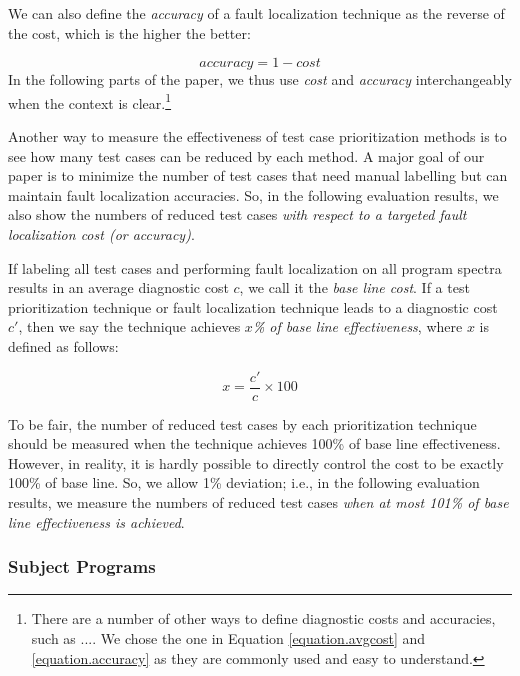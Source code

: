 We can also define the {\em accuracy} of a fault localization technique as the reverse of the cost, which is the higher the better:

\begin{equation}\label{equation.accuracy}
	accuracy = 1 - cost
\end{equation}
In the following parts of the paper, we thus use {\em cost} and {\em accuracy} interchangeably when the context is clear.\footnote{There are a number of other ways to define diagnostic costs and accuracies, such as .... We chose the one in Equation \ref{equation.avgcost} and \ref{equation.accuracy} as they are commonly used and easy to understand.}

Another way to measure the effectiveness of test case prioritization methods is to see how many test cases can be reduced by each method.
A major goal of our paper is to minimize the number of test cases that need manual labelling but can maintain fault localization accuracies. So, in the following evaluation results, we also show the numbers of reduced test cases {\em with respect to a targeted fault localization cost (or accuracy)}.

If labeling all test cases and performing fault localization on all program spectra results in an average diagnostic cost $c$, we call it the {\em base line cost}. If a test prioritization technique or fault localization technique leads to a diagnostic cost $c'$, then we say the technique achieves {\em $x$\% of base line effectiveness}, where $x$ is defined as follows:

\begin{equation}\label{equation.baselinecost}
	x = \frac{c'}{c} \times 100
\end{equation}

To be fair, the number of reduced test cases by each prioritization technique should be measured when the technique achieves 100\% of base line effectiveness. However, in reality, it is hardly possible to directly control the cost to be exactly 100\% of base line. So, we allow 1\% deviation; i.e., in the following evaluation results, we measure the numbers of reduced test cases {\em when at most 101\% of base line effectiveness is achieved}.


\subsubsection{Subject Programs}\label{sec.exp.subject}

